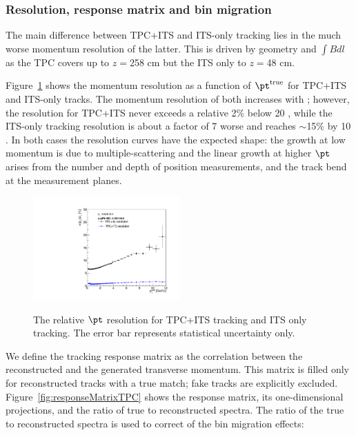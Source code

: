 \FloatBarrier

\subsubsection{Resolution, response matrix and bin migration}
The main difference between TPC+ITS and ITS-only tracking lies in the much worse momentum resolution of the latter. This is driven by geometry 
and $\int Bdl$ as the TPC covers up to {$z=$258 cm} but the ITS only to {$z=$48 cm}. 

Figure~\ref{fig:resolution} shows the momentum resolution as a function of $\pt^{\mathrm{true}}$ for 
TPC+ITS and ITS-only tracks. The momentum resolution of both increases with \pt; however, the resolution for TPC+ITS never exceeds a relative 2\% below 20 \GeVc, while the ITS-only tracking resolution is about a factor of 7 worse and reaches $\sim$15\% by 10 \GeVc. In both cases the resolution curves have the expected shape: the growth at low momentum is due to multiple-scattering and the linear growth at higher $\pt$ arises from the number and depth of position measurements, and the track bend at the measurement planes. 
\begin{figure}[h]
\center
\includegraphics[width=0.5\textwidth]{Data_Analysis/Tracking/HybridAndITS_resolution_lowpt.pdf}\\
\caption{The relative $\pt$ resolution for TPC+ITS tracking and ITS only tracking. The error bar represents statistical uncertainty only.}
\label{fig:resolution}
\end{figure}

We define the tracking response matrix as the correlation between the reconstructed and the generated transverse momentum. This matrix is filled only for reconstructed tracks with a true match; fake tracks are explicitly excluded. Figure~\ref{fig:responseMatrixTPC} shows the response matrix, its one-dimensional projections, and the ratio of true to reconstructed spectra. The ratio of the true to reconstructed spectra is used to correct of the bin migration effects:

